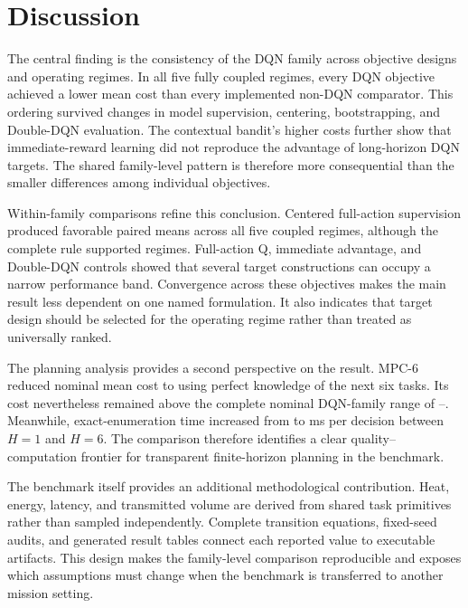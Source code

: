 \documentclass[11pt]{article}
\begin{document}
\color{red}%
\section{Discussion}
\color{black}%

\color{red}%
The central finding is the consistency of the DQN family across objective designs and operating regimes. In all five fully coupled regimes, every DQN objective achieved a lower mean cost than every implemented non-DQN comparator. This ordering survived changes in model supervision, centering, bootstrapping, and Double-DQN evaluation. The contextual bandit's higher costs further show that immediate-reward learning did not reproduce the advantage of long-horizon DQN targets. The shared family-level pattern is therefore more consequential than the smaller differences among individual objectives.
\color{black}%

\color{red}%
Within-family comparisons refine this conclusion. Centered full-action supervision produced favorable paired means across all five coupled regimes, although the complete rule supported \PrimarySupportedCount{} regimes. Full-action Q, immediate advantage, and Double-DQN controls showed that several target constructions can occupy a narrow performance band. Convergence across these objectives makes the main result less dependent on one named formulation. It also indicates that target design should be selected for the operating regime rather than treated as universally ranked.
\color{black}%

\color{red}%
The planning analysis provides a second perspective on the result. MPC-6 reduced nominal mean cost to \PlannerCostHSix{} using perfect knowledge of the next six tasks. Its cost nevertheless remained above the complete nominal DQN-family range of \DQNFamilyNominalMinCost--\DQNFamilyNominalMaxCost. Meanwhile, exact-enumeration time increased from \PlannerTimeHOne{} to \PlannerTimeHSix{} ms per decision between $H=1$ and $H=6$. The comparison therefore identifies a clear quality--computation frontier for transparent finite-horizon planning in the benchmark.
\color{black}%

\color{red}%
The benchmark itself provides an additional methodological contribution. Heat, energy, latency, and transmitted volume are derived from shared task primitives rather than sampled independently. Complete transition equations, fixed-seed audits, and generated result tables connect each reported value to executable artifacts. This design makes the family-level comparison reproducible and exposes which assumptions must change when the benchmark is transferred to another mission setting.
\color{black}%
\end{document}
